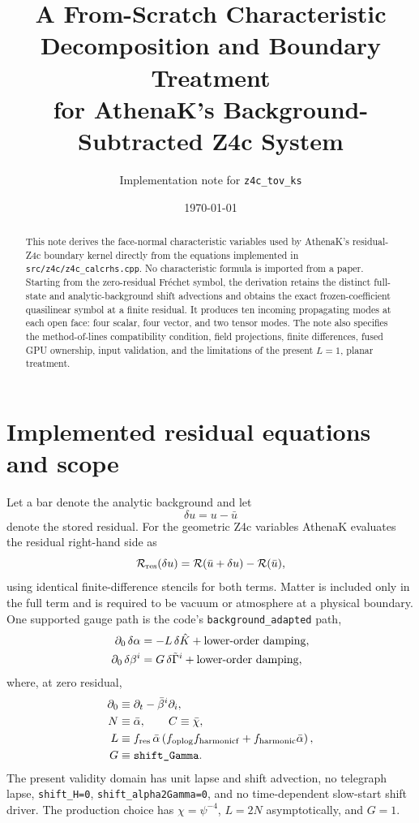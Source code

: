 \documentclass[11pt]{article}
\title{A From-Scratch Characteristic Decomposition and Boundary Treatment\\
for AthenaK's Background-Subtracted Z4c System}
\author{Implementation note for \texttt{z4c\_tov\_ks}}
\date{\today}
\newcommand{\dtzero}{\partial_0}
\begin{document}
\maketitle

\begin{abstract}
This note derives the face-normal characteristic variables used by AthenaK's
residual-Z4c boundary kernel directly from the equations implemented in
\texttt{src/z4c/z4c\_calcrhs.cpp}.  No characteristic formula is imported from
a paper.  Starting from the zero-residual Fr\'echet symbol, the derivation
retains the distinct full-state and analytic-background shift advections and
obtains the exact frozen-coefficient quasilinear symbol at a finite residual.
It produces ten incoming propagating modes at each open face: four scalar,
four vector, and two tensor modes.  The note also specifies the
method-of-lines compatibility condition, field projections, finite
differences, fused GPU ownership, input validation, and the limitations of the
present \(L=1\), planar treatment.
\end{abstract}

\section{Implemented residual equations and scope}

Let a bar denote the analytic background and let
\[
  \delta u = u-\bar u
\]
denote the stored residual.  For the geometric Z4c variables AthenaK evaluates
the residual right-hand side as
\[
  {\cal R}_{\rm res}(\delta u)
  ={\cal R}(\bar u+\delta u)-{\cal R}(\bar u),
  \label{eq:residual}
\]
using identical finite-difference stencils for both terms.  Matter is included
only in the full term and is required to be vacuum or atmosphere at a physical
boundary.  One supported gauge path is the code's
\texttt{background\_adapted} path,
\begin{align}
 \dtzero\,\delta\alpha &=-L\,\delta\hat K
                  +\hbox{lower-order damping}, \label{eq:lapse}\\
 \dtzero\,\delta\beta^i &=G\,\delta\tilde\Gamma^i
                  +\hbox{lower-order damping}, \label{eq:shift}
\end{align}
where, at zero residual,
\begin{align}
 \dtzero &\equiv \partial_t-\bar\beta^i\partial_i,\\
 N&\equiv\bar\alpha,\qquad C\equiv\bar\chi,\\
 L&\equiv f_{\rm res}\,\bar\alpha
       \left(f_{\rm oplog}f_{\rm harmonicf}
             +f_{\rm harmonic}\bar\alpha\right),\\
 G&\equiv \texttt{shift\_Gamma}.
\end{align}
The present validity domain has unit lapse and shift advection, no telegraph
lapse, \texttt{shift\_H=0}, \texttt{shift\_alpha2Gamma=0}, and no
time-dependent slow-start shift driver.  The production choice has
\(\chi=\psi^{-4}\), \(L=2N\) asymptotically, and \(G=1\).
\end{document}
